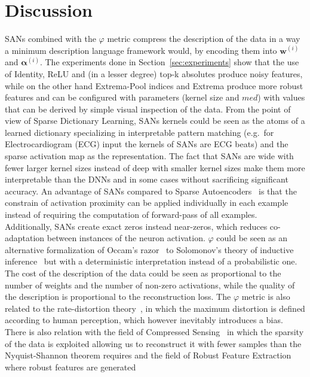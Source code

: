 \documentclass[journal]{IEEEtran}
\begin{document}
\section{Discussion}\label{sec:discussion}
SANs combined with the $\varphi$ metric compress the description of
the data in a way a minimum description language framework would, by
encoding them into $\bm{w}^{(i)}$ and $\bm{\alpha}^{(i)}$.
The experiments done in Section~\ref{sec:experiments} show that the
use of Identity, ReLU and (in a lesser degree) top-k absolutes
produce noisy features, while on the other hand Extrema-Pool indices
and Extrema produce more robust features and can be configured with
parameters (kernel size and $med$) with values that can be derived by
simple visual inspection of the data.
From the point of view of Sparse Dictionary Learning, SANs kernels
could be seen as the atoms of a learned dictionary specializing in
interpretable pattern matching (e.g.\ for Electrocardiogram (ECG)
input the kernels of SANs are ECG beats) and the sparse activation
map as the representation.
The fact that SANs are wide with fewer larger kernel sizes instead of
deep with smaller kernel sizes make them more interpretable than the
DNNs and in some cases without sacrificing significant accuracy.
An advantage of SANs compared to Sparse
Autoencoders~\cite{ng2011sparse} is that the constrain of activation
proximity can be applied individually in each example instead of
requiring the computation of forward-pass of all examples.
Additionally, SANs create exact zeros instead near-zeros, which
reduces co-adaptation between instances of the neuron activation.
$\varphi$ could be seen as an alternative formalization of Occam's
razor~\cite{soklakov2002occam} to Solomonov's theory of inductive
inference~\cite{solomonoff1964formal} but with a deterministic
interpretation instead of a probabilistic one.
The cost of the description of the data could be seen as proportional
to the number of weights and the number of non-zero activations,
while the quality of the description is proportional to the reconstruction loss.
The $\varphi$ metric is also related to the rate-distortion
theory~\cite{burger1971rate}, in which the maximum distortion is
defined according to human perception, which however inevitably
introduces a bias.
There is also relation with the field of Compressed
Sensing~\cite{donoho2006compressed} in which the sparsity of the data
is exploited allowing us to reconstruct it with fewer samples than
the Nyquist-Shannon theorem requires and the field of Robust Feature
Extraction~\cite{kim2013deep} where robust features are generated
\end{document}
